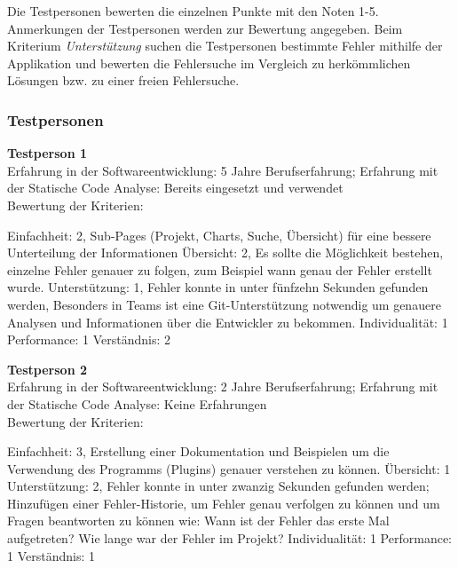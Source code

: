 Die Testpersonen bewerten die einzelnen Punkte mit den Noten 1-5. Anmerkungen der Testpersonen werden zur Bewertung angegeben. Beim Kriterium \textit{Unterstützung} suchen die Testpersonen bestimmte Fehler  mithilfe der Applikation und bewerten die Fehlersuche im Vergleich zu herkömmlichen Lösungen bzw. zu einer freien Fehlersuche.
\subsubsection{Testpersonen}
\textbf{Testperson 1} \\
Erfahrung in der Softwareentwicklung: 5 Jahre Berufserfahrung; Erfahrung mit der Statische Code Analyse: Bereits eingesetzt und verwendet \\
Bewertung der Kriterien:

Einfachheit: 2, Sub-Pages (Projekt, Charts, Suche, Übersicht) für eine bessere Unterteilung der Informationen \newline Übersicht: 2, Es sollte die Möglichkeit bestehen, einzelne Fehler genauer zu folgen, zum Beispiel wann genau der Fehler erstellt wurde. \newline  Unterstützung: 1, Fehler konnte in unter fünfzehn Sekunden gefunden werden, Besonders in Teams ist eine Git-Unterstützung notwendig um genauere Analysen und Informationen über die Entwickler zu bekommen.  \newline  Individualität: 1 \newline  Performance: 1 \newline  Verständnis: 2 \newline 

\textbf{Testperson 2} \\
Erfahrung in der Softwareentwicklung: 2 Jahre Berufserfahrung; Erfahrung mit der Statische Code Analyse: Keine Erfahrungen\\
Bewertung der Kriterien:

Einfachheit: 3, Erstellung einer Dokumentation und Beispielen um die Verwendung des Programms (Plugins) genauer verstehen zu können. \newline  Übersicht: 1 \newline  Unterstützung: 2, Fehler konnte in unter zwanzig Sekunden gefunden werden; Hinzufügen einer Fehler-Historie, um Fehler genau verfolgen zu können und um Fragen beantworten zu können wie: Wann ist der Fehler das erste Mal aufgetreten? Wie lange war der Fehler im Projekt? \newline  Individualität: 1 \newline  Performance: 1 \newline  Verständnis: 1 \newline 

